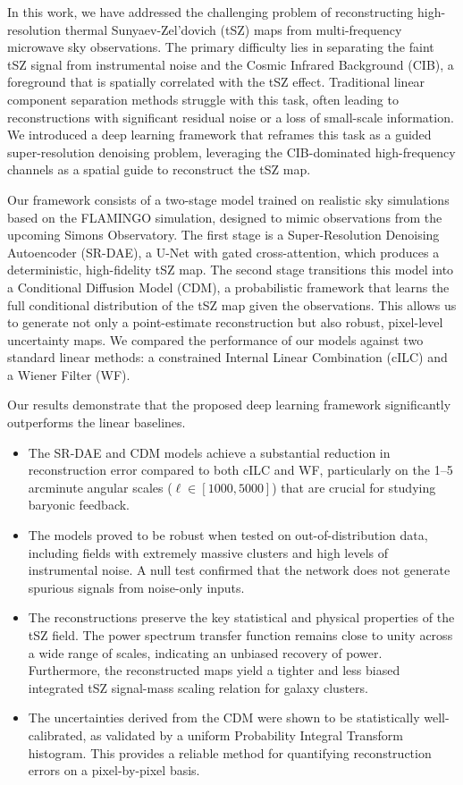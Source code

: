 \documentclass[]{article}
\begin{document}
In this work, we have addressed the challenging problem of reconstructing high-resolution thermal Sunyaev-Zel'dovich (tSZ) maps from multi-frequency microwave sky observations. The primary difficulty lies in separating the faint tSZ signal from instrumental noise and the Cosmic Infrared Background (CIB), a foreground that is spatially correlated with the tSZ effect. Traditional linear component separation methods struggle with this task, often leading to reconstructions with significant residual noise or a loss of small-scale information. We introduced a deep learning framework that reframes this task as a guided super-resolution denoising problem, leveraging the CIB-dominated high-frequency channels as a spatial guide to reconstruct the tSZ map.

Our framework consists of a two-stage model trained on realistic sky simulations based on the FLAMINGO simulation, designed to mimic observations from the upcoming Simons Observatory. The first stage is a Super-Resolution Denoising Autoencoder (SR-DAE), a U-Net with gated cross-attention, which produces a deterministic, high-fidelity tSZ map. The second stage transitions this model into a Conditional Diffusion Model (CDM), a probabilistic framework that learns the full conditional distribution of the tSZ map given the observations. This allows us to generate not only a point-estimate reconstruction but also robust, pixel-level uncertainty maps. We compared the performance of our models against two standard linear methods: a constrained Internal Linear Combination (cILC) and a Wiener Filter (WF).

Our results demonstrate that the proposed deep learning framework significantly outperforms the linear baselines.
\begin{itemize}
    \item The SR-DAE and CDM models achieve a substantial reduction in reconstruction error compared to both cILC and WF, particularly on the 1--5 arcminute angular scales ($\ell \in [1000, 5000]$) that are crucial for studying baryonic feedback.
    \item The models proved to be robust when tested on out-of-distribution data, including fields with extremely massive clusters and high levels of instrumental noise. A null test confirmed that the network does not generate spurious signals from noise-only inputs.
    \item The reconstructions preserve the key statistical and physical properties of the tSZ field. The power spectrum transfer function remains close to unity across a wide range of scales, indicating an unbiased recovery of power. Furthermore, the reconstructed maps yield a tighter and less biased integrated tSZ signal-mass scaling relation for galaxy clusters.
    \item The uncertainties derived from the CDM were shown to be statistically well-calibrated, as validated by a uniform Probability Integral Transform histogram. This provides a reliable method for quantifying reconstruction errors on a pixel-by-pixel basis.
\end{itemize}
\end{document}
